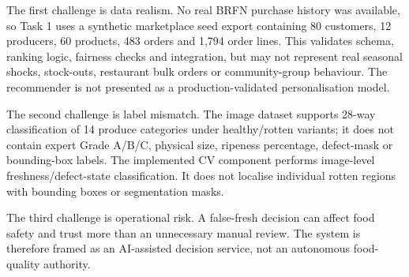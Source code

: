 \documentclass[11pt,a4paper]{article}
\begin{document}
The first challenge is data realism. No real BRFN purchase history was available, so Task 1 uses a synthetic marketplace seed export containing 80 customers, 12 producers, 60 products, 483 orders and 1,794 order lines. This validates schema, ranking logic, fairness checks and integration, but may not represent real seasonal shocks, stock-outs, restaurant bulk orders or community-group behaviour. The recommender is not presented as a production-validated personalisation model.

The second challenge is label mismatch. The image dataset supports 28-way classification of 14 produce categories under healthy/rotten variants; it does not contain expert Grade A/B/C, physical size, ripeness percentage, defect-mask or bounding-box labels. The implemented CV component performs image-level freshness/defect-state classification. It does not localise individual rotten regions with bounding boxes or segmentation masks.

The third challenge is operational risk. A false-fresh decision can affect food safety and trust more than an unnecessary manual review. The system is therefore framed as an AI-assisted decision service, not an autonomous food-quality authority.
\end{document}
